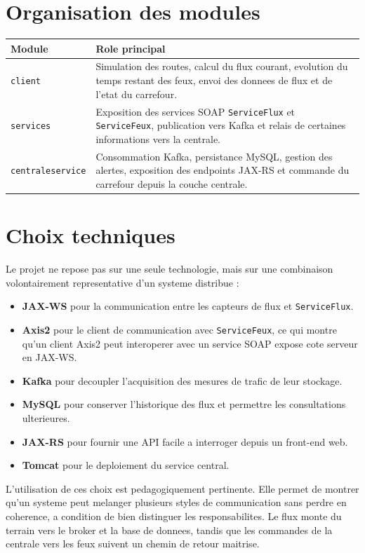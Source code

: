 \documentclass[12pt,a4paper]{report}
\begin{document}
\section*{Organisation des modules}
\begin{longtable}{p{3cm}p{10.5cm}}
\toprule
\textbf{Module} & \textbf{Role principal} \\
\midrule
\endhead
\texttt{client} & Simulation des routes, calcul du flux courant, evolution du temps restant des feux, envoi des donnees de flux et de l'etat du carrefour. \\
\texttt{services} & Exposition des services SOAP \texttt{ServiceFlux} et \texttt{ServiceFeux}, publication vers Kafka et relais de certaines informations vers la centrale. \\
\texttt{centraleservice} & Consommation Kafka, persistance MySQL, gestion des alertes, exposition des endpoints JAX-RS et commande du carrefour depuis la couche centrale. \\
\bottomrule
\end{longtable}

\section*{Choix techniques}
Le projet ne repose pas sur une seule technologie, mais sur une combinaison volontairement representative d'un systeme distribue :

\begin{itemize}
    \item \textbf{JAX-WS} pour la communication entre les capteurs de flux et \texttt{ServiceFlux}.
    \item \textbf{Axis2} pour le client de communication avec \texttt{ServiceFeux}, ce qui montre qu'un client Axis2 peut interoperer avec un service SOAP expose cote serveur en JAX-WS.
    \item \textbf{Kafka} pour decoupler l'acquisition des mesures de trafic de leur stockage.
    \item \textbf{MySQL} pour conserver l'historique des flux et permettre les consultations ulterieures.
    \item \textbf{JAX-RS} pour fournir une API facile a interroger depuis un front-end web.
    \item \textbf{Tomcat} pour le deploiement du service central.
\end{itemize}

L'utilisation de ces choix est pedagogiquement pertinente. Elle permet de montrer qu'un systeme peut melanger plusieurs styles de communication sans perdre en coherence, a condition de bien distinguer les responsabilites. Le flux monte du terrain vers le broker et la base de donnees, tandis que les commandes de la centrale vers les feux suivent un chemin de retour maitrise.
\end{document}
